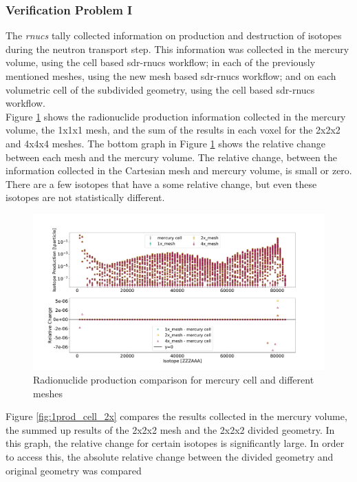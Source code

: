 \subsubsection{Verification Problem I}
The \emph{rnucs} tally collected information on production and destruction of
isotopes during the neutron transport step. This information was collected
in the mercury volume, using the cell based \gls{sdr}-rnucs workflow;
in each of the previously mentioned meshes, using the new mesh based
\gls{sdr}-rnucs workflow; and on each volumetric cell of the subdivided
geometry, using the cell based \gls{sdr}-rnucs workflow.\\
Figure \ref{fig:1prod_cell_1x_2x_4x} shows the radionuclide production information
collected in the mercury volume, the 1x1x1 mesh, and the sum of the results in
each voxel for the 2x2x2 and 4x4x4 meshes. The bottom graph in Figure
\ref{fig:1prod_cell_1x_2x_4x} shows the relative change between each mesh and the
mercury volume.
The relative change, between the information collected in the Cartesian mesh and
mercury volume, is small or zero. There are a few isotopes that
have a some relative change, but even these isotopes are not statistically different.
%
\begin{figure}[H]
	\centering
	\includegraphics[scale=0.4,trim={2cm 1cm 3cm 2cm},clip]{../figs/toy_p1/prod_VPI_1x_2x_4x.pdf}
	\caption{Radionuclide production comparison for mercury cell and different meshes}
	\label{fig:1prod_cell_1x_2x_4x}
\end{figure}
%
Figure \ref{fig:1prod_cell_2x} compares the results collected in the mercury
volume, the summed up results of the 2x2x2 mesh and the 2x2x2 divided geometry. In
this graph, the relative change for certain isotopes is significantly large.
In order to access this, the absolute
relative change between the divided geometry and original geometry was compared
